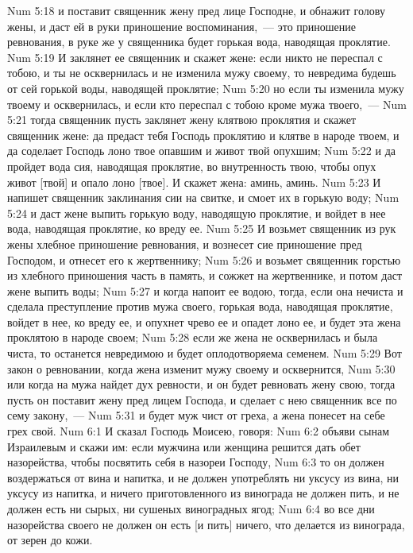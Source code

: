 \vs Num 5:18 и поставит священник жену пред лице Господне, и обнажит голову жены, и даст ей в руки приношение воспоминания,~--- это приношение ревнования, в руке же у священника будет горькая вода, наводящая проклятие.
\vs Num 5:19 И заклянет ее священник и скажет жене: если никто не переспал с тобою, и ты не осквернилась и не изменила мужу своему, то невредима будешь от сей горькой воды, наводящей проклятие;
\vs Num 5:20 но если ты изменила мужу твоему и осквернилась, и если кто переспал с тобою кроме мужа твоего,~---
\vs Num 5:21 тогда священник пусть заклянет жену клятвою проклятия и скажет священник жене: да предаст тебя Господь проклятию и клятве в народе твоем, и да соделает Господь лоно твое опавшим и живот твой опухшим;
\vs Num 5:22 и да пройдет вода сия, наводящая проклятие, во внутренность твою, чтобы опух живот [твой] и опало лоно [твое]. И скажет жена: аминь, аминь.
\vs Num 5:23 И напишет священник заклинания сии на свитке, и смоет их в горькую воду;
\vs Num 5:24 и даст жене выпить горькую воду, наводящую проклятие, и войдет в нее вода, наводящая проклятие, ко вреду ее.
\vs Num 5:25 И возьмет священник из рук жены хлебное приношение ревнования, и вознесет сие приношение пред Господом, и отнесет его к жертвеннику;
\vs Num 5:26 и возьмет священник горстью из хлебного приношения часть в память, и сожжет на жертвеннике, и потом даст жене выпить воды;
\vs Num 5:27 и когда напоит ее водою, тогда, если она нечиста и сделала преступление против мужа своего, горькая вода, наводящая проклятие, войдет в нее, ко вреду ее, и опухнет чрево ее и опадет лоно ее, и будет эта жена проклятою в народе своем;
\vs Num 5:28 если же жена не осквернилась и была чиста, то останется невредимою и будет оплодотворяема семенем.
\vs Num 5:29 Вот закон о ревновании, когда жена изменит мужу своему и осквернится,
\vs Num 5:30 или когда на мужа найдет дух ревности, и он будет ревновать жену свою, тогда пусть он поставит жену пред лицем Господа, и сделает с нею священник все по сему закону,~---
\vs Num 5:31 и будет муж чист от греха, а жена понесет на себе грех свой.
\vs Num 6:1 И сказал Господь Моисею, говоря:
\vs Num 6:2 объяви сынам Израилевым и скажи им: если мужчина или женщина решится дать обет назорейства, чтобы посвятить себя в назореи Господу,
\vs Num 6:3 то он должен воздержаться от вина и  напитка, и не должен употреблять ни уксусу из вина, ни уксусу из напитка, и ничего приготовленного из винограда не должен пить, и не должен есть ни сырых, ни сушеных виноградных ягод;
\vs Num 6:4 во все дни назорейства своего не должен он есть [и пить] ничего, что делается из винограда, от зерен до кожи.
